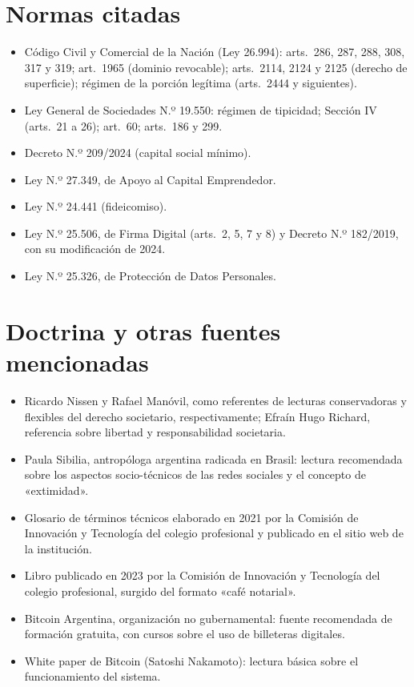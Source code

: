 \documentclass[12pt,oneside]{book}
\begin{document}
\section*{Normas citadas}
\begin{itemize}
    \item Código Civil y Comercial de la Nación (Ley 26.994): arts.~286, 287, 288, 308, 317 y 319; art.~1965 (dominio revocable); arts.~2114, 2124 y 2125 (derecho de superficie); régimen de la porción legítima (arts.~2444 y siguientes).
    \item Ley General de Sociedades N.º 19.550: régimen de tipicidad; Sección IV (arts.~21 a 26); art.~60; arts.~186 y 299.
    \item Decreto N.º 209/2024 (capital social mínimo).
    \item Ley N.º 27.349, de Apoyo al Capital Emprendedor.
    \item Ley N.º 24.441 (fideicomiso).
    \item Ley N.º 25.506, de Firma Digital (arts.~2, 5, 7 y 8) y Decreto N.º 182/2019, con su modificación de 2024.
    \item Ley N.º 25.326, de Protección de Datos Personales.
\end{itemize}

\section*{Doctrina y otras fuentes mencionadas}
\begin{itemize}
    \item Ricardo Nissen y Rafael Manóvil, como referentes de lecturas conservadoras y flexibles del derecho societario, respectivamente; Efraín Hugo Richard, referencia sobre libertad y responsabilidad societaria.
    \item Paula Sibilia, antropóloga argentina radicada en Brasil: lectura recomendada sobre los aspectos socio-técnicos de las redes sociales y el concepto de «extimidad».
    \item Glosario de términos técnicos elaborado en 2021 por la Comisión de Innovación y Tecnología del colegio profesional y publicado en el sitio web de la institución.
    \item Libro publicado en 2023 por la Comisión de Innovación y Tecnología del colegio profesional, surgido del formato «café notarial».
    \item Bitcoin Argentina, organización no gubernamental: fuente recomendada de formación gratuita, con cursos sobre el uso de billeteras digitales.
    \item White paper de Bitcoin (Satoshi Nakamoto): lectura básica sobre el funcionamiento del sistema.
\end{itemize}
\end{document}
